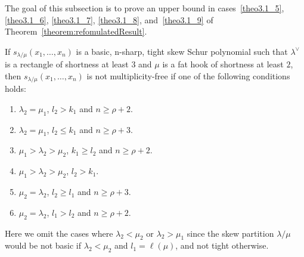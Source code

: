 The goal of this subsection is to prove an upper bound in cases~\ref{theo3.1_5}, \ref{theo3.1_6}, \ref{theo3.1_7}, \ref{theo3.1_8}, and~\ref{theo3.1_9} of Theorem~\ref{theorem:refomulatedResult}.


\begin{theorem}
\label{thm:suffshort3}
If $s_{\lambda/\mu}(x_1,\ldots,x_n)$ is a basic, n-sharp, tight skew Schur polynomial such that $\lambda^\vee$ is a rectangle of shortness at least $3$ and $\mu$ is a fat hook of shortness at least $2$, then $s_{\lambda/\mu}(x_1,\ldots,x_n)$ is not multiplicity-free if one of the following conditions holds:
\begin{enumerate}[label=(\Roman{*})]
 \item\label{theo3.13_1} $\lambda_2 = \mu_1$, $l_2 > k_1$ and $n\geq \rho+2$.
 \item\label{theo3.13_2} $\lambda_2 = \mu_1$, $l_2 \leq k_1$ and $n\geq \rho+3$.
 \item\label{theo3.13_3} $\mu_1 > \lambda_2 > \mu_2$, $k_1 \geq l_2$ and $n \geq \rho+2$.
 \item\label{theo3.13_4} $\mu_1 > \lambda_2 > \mu_2$, $l_2 > k_1$.
 \item\label{theo3.13_5} $\mu_2 = \lambda_2$, $l_2 \geq l_1$ and $n\geq \rho+3$.
 \item\label{theo3.13_6} $\mu_2 = \lambda_2$, $l_1 > l_2$ and $n\geq \rho+2$.
\end{enumerate}
\end{theorem}

Here we omit the cases where $\lambda_2<\mu_2$ or $\lambda_2>\mu_1$ since the skew partition $\lambda/\mu$ would be not basic if $\lambda_2<\mu_2$ and $l_1 = \ell(\mu)$, and not tight otherwise. 


